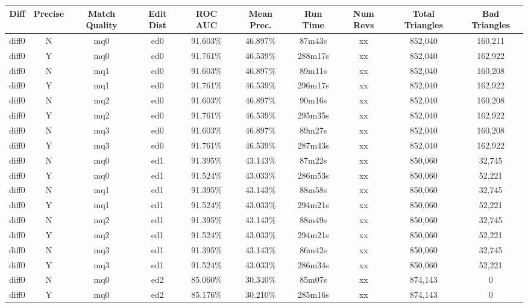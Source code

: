 \begin{sidewaystable}[!tp]
  \begin{center}
    \begin{tabular}{|c|c|c|c||c|c||c|c|c|c|}
\hline
Diff & Precise & Match Quality & Edit Dist
	& ROC AUC & Mean Prec.
	& Run Time & Num Revs
	& Total Triangles & Bad Triangles \\
\hline
\hline
diff0 & N & mq0 & ed0
	& 91.603\% & 46.897\%
	& 87m43s & xx
	& 852,040 & 160,211 \\
diff0 & Y & mq0 & ed0
	& 91.761\% & 46.539\%
	& 288m17s & xx
	& 852,040 & 162,922 \\
diff0 & N & mq1 & ed0
	& 91.603\% & 46.897\%
	& 89m11s & xx
	& 852,040 & 160,208 \\
diff0 & Y & mq1 & ed0
	& 91.761\% & 46.539\%
	& 296m17s & xx
	& 852,040 & 162,922 \\
diff0 & N & mq2 & ed0
	& 91.603\% & 46.897\%
	& 90m16s & xx
	& 852,040 & 160,208 \\
diff0 & Y & mq2 & ed0
	& 91.761\% & 46.539\%
	& 295m35s & xx
	& 852,040 & 162,922 \\
diff0 & N & mq3 & ed0
	& 91.603\% & 46.897\%
	& 89m27s & xx
	& 852,040 & 160,208 \\
diff0 & Y & mq3 & ed0
	& 91.761\% & 46.539\%
	& 287m43s & xx
	& 852,040 & 162,922 \\
diff0 & N & mq0 & ed1
	& 91.395\% & 43.143\%
	& 87m22s & xx
	& 850,060 & 32,745 \\
diff0 & Y & mq0 & ed1
	& 91.524\% & 43.033\%
	& 286m53s & xx
	& 850,060 & 52,221 \\
diff0 & N & mq1 & ed1
	& 91.395\% & 43.143\%
	& 88m58s & xx
	& 850,060 & 32,745 \\
diff0 & Y & mq1 & ed1
	& 91.524\% & 43.033\%
	& 294m21s & xx
	& 850,060 & 52,221 \\
diff0 & N & mq2 & ed1
	& 91.395\% & 43.143\%
	& 88m49s & xx
	& 850,060 & 32,745 \\
diff0 & Y & mq2 & ed1
	& 91.524\% & 43.033\%
	& 294m21s & xx
	& 850,060 & 52,221 \\
diff0 & N & mq3 & ed1
	& 91.395\% & 43.143\%
	& 86m42s & xx
	& 850,060 & 32,745 \\
diff0 & Y & mq3 & ed1
	& 91.524\% & 43.033\%
	& 286m34s & xx
	& 850,060 & 52,221 \\
diff0 & N & mq0 & ed2
	& 85.060\% & 30.340\%
	& 85m07s & xx
	& 874,143 & 0 \\
diff0 & Y & mq0 & ed2
	& 85.176\% & 30.210\%
	& 285m16s & xx
	& 874,143 & 0 \\

\end{tabular}
\end{center}
\end{sidewaystable}
